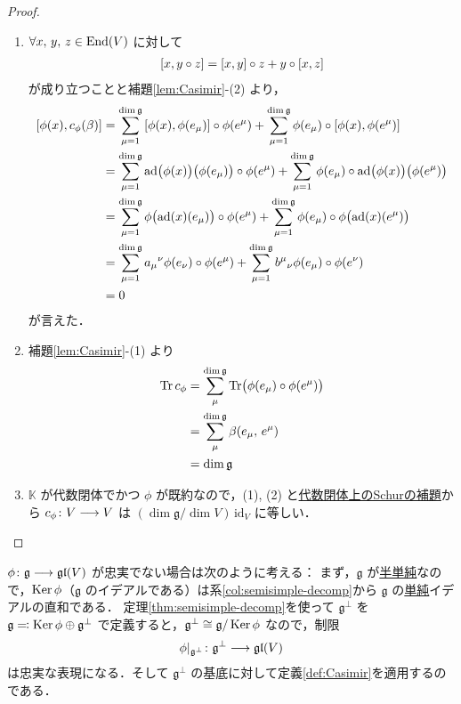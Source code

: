 \documentclass[rep_main]{subfiles}
\begin{document}
\begin{proof}
	\begin{enumerate}
		\item $\forall x,\,y,\, z\in \operatorname{End} (V)$ に対して
		\begin{align}
			\comm{x}{y \circ z} = \comm{x}{y} \circ z + y \circ \comm{x}{z}
		\end{align}
		が成り立つことと補題\ref{lem:Casimir}-(2) より，
		\begin{align}
			\comm{\phi(x)}{c_\phi(\beta)} 
			&= \sum_{\mu=1}^{\dim \mathfrak{g}} \comm{\phi(x)}{\phi(e_\mu)} \circ \phi(e^\mu) + \sum_{\mu=1}^{\dim \mathfrak{g}} \phi(e_\mu) \circ \comm{\phi(x)}{\phi(e^\mu)} \\
			&= \sum_{\mu=1}^{\dim \mathfrak{g}} \ad\bigl(\phi(x)\bigr)\bigl(\phi(e_\mu)\bigr) \circ \phi(e^\mu) + \sum_{\mu=1}^{\dim \mathfrak{g}} \phi(e_\mu) \circ  \ad\bigl(\phi(x)\bigr)\bigl(\phi(e^\mu)\bigr) \\
			&= \sum_{\mu=1}^{\dim \mathfrak{g}} \phi\bigl(\ad(x)(e_\mu)\bigr) \circ \phi(e^\mu) + \sum_{\mu=1}^{\dim \mathfrak{g}} \phi(e_\mu) \circ  \phi\bigl(\ad(x)(e^\mu)\bigr) \\
			&= \sum_{\mu=1}^{\dim \mathfrak{g}} a_\mu{}^\nu \phi(e_\nu) \circ \phi(e^\mu) + \sum_{\mu=1}^{\dim \mathfrak{g}} b^\mu{}_\nu\phi(e_\mu) \circ \phi(e^\nu) \\
			&= 0
		\end{align}
		が言えた．
		\item 補題\ref{lem:Casimir}-(1) より
		\begin{align}
			\Tr c_\phi 
			&= \sum_{\mu}^{\dim \mathfrak{g}} \Tr \bigl(\phi(e_\mu) \circ \phi(e^\mu) \bigr) \\
			&= \sum_{\mu}^{\dim \mathfrak{g}} \beta (e_\mu,\, e^\mu) \\
			&= \dim \mathfrak{g}
		\end{align}
		\item $\mathbb{K}$ が代数閉体でかつ $\phi$ が既約なので，(1), (2) と\hyperref[col:Schur-closed]{代数閉体上のSchurの補題}から $c_\phi \colon V \longrightarrow V$ は $(\dim \mathfrak{g} / \dim V) \, \mathrm{id}_V$ に等しい．
	\end{enumerate}
	
\end{proof}


$\phi \colon \mathfrak{g} \longrightarrow \mathfrak{gl} (V)$ が忠実でない場合は次のように考える：
まず，$\mathfrak{g}$ が\hyperref[def:semisimple-LieAlg]{半単純}なので，$\operatorname{Ker} \phi$（$\mathfrak{g}$ のイデアルである）は系\ref{col:semisimple-decomp}から $\mathfrak{g}$ の\hyperref[def:simple-LieAlg]{単純}イデアルの直和である．
定理\ref{thm:semisimple-decomp}を使って $\mathfrak{g}^\perp$ を $\mathfrak{g} \eqqcolon \operatorname{Ker} \phi \oplus \mathfrak{g}^\perp$ で定義すると，$\mathfrak{g}^\perp \cong \mathfrak{g}/\operatorname{Ker} \phi$ なので，制限
\begin{align}
	\phi|_{\mathfrak{g}^\perp} \colon \mathfrak{g}^\perp \longrightarrow \mathfrak{gl} (V)
\end{align}
は忠実な表現になる．そして $\mathfrak{g}^\perp$ の基底に対して定義\ref{def:Casimir}を適用するのである．
\end{document}
